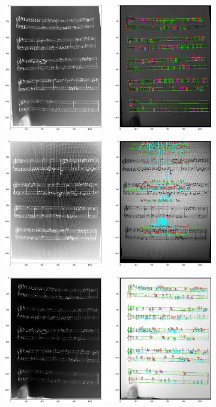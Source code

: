 \documentclass[12pt]{article}
\begin{document}
\begin{enumerate}
			\begin{figure}
				\begin{subfigure}[b]{0.48\linewidth}
					\includegraphics[width=\linewidth]{Hard/Zdj20.png}
				\end{subfigure}
				\begin{subfigure}[b]{0.48\linewidth}
					\includegraphics[width=\linewidth]{Hard/Zdj21.png}
				\end{subfigure}
				\begin{subfigure}[b]{0.48\linewidth}
					\includegraphics[width=\linewidth]{Hard/Zdj22.png}

\end{subfigure}
\end{figure}
\end{enumerate}
\end{document}
